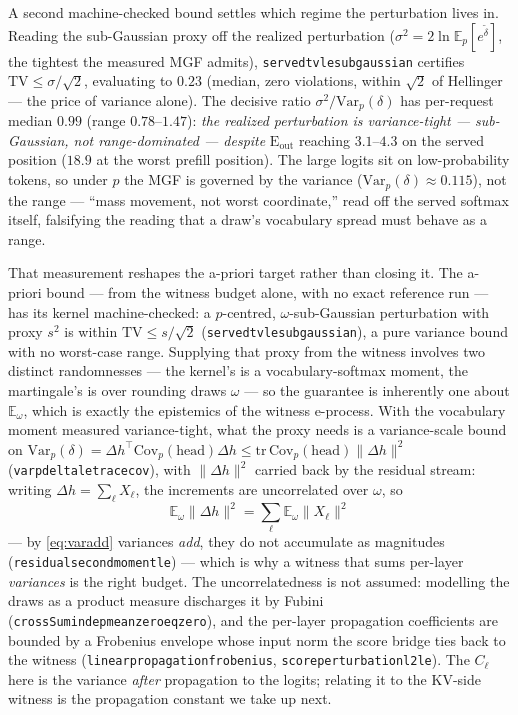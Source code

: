 \documentclass[11pt]{article}
\renewcommand{\_}{\WCorigunderscore\allowbreak}
\begin{document}
A second machine-checked bound settles which regime the perturbation
lives in. Reading the sub-Gaussian proxy off the realized perturbation
($\sigma^2=2\ln\mathbb{E}_p[e^{\tilde\delta}]$, the tightest the
measured MGF admits), \texttt{served\_tv\_le\_subgaussian} certifies
$\mathrm{TV}\le\sigma/\sqrt2$, evaluating to $0.23$ (median, zero
violations, within $\sqrt2$ of Hellinger --- the price of variance
alone). The decisive ratio $\sigma^2/\mathrm{Var}_p(\delta)$ has
per-request median $0.99$ (range $0.78$--$1.47$): \emph{the realized
perturbation is variance-tight --- sub-Gaussian, not range-dominated
--- despite} $\mathrm{E_{out}}$ reaching $3.1$--$4.3$ on the served
position ($18.9$ at the worst prefill position). The large logits sit
on low-probability tokens, so under $p$ the MGF is governed by the
variance ($\mathrm{Var}_p(\delta)\approx0.115$), not the range ---
``mass movement, not worst coordinate,'' read off the served softmax
itself, falsifying the reading that a draw's vocabulary spread must
behave as a range.

That measurement reshapes the a-priori target rather than closing it.
The a-priori bound --- from the witness budget alone, with no exact
reference run --- has its kernel machine-checked: a $p$-centred,
$\omega$-sub-Gaussian perturbation with proxy $s^2$ is within
$\mathrm{TV}\le s/\sqrt2$ (\texttt{served\_tv\_le\_subgaussian}), a pure
variance bound with no worst-case range. Supplying that proxy from the
witness involves two distinct randomnesses --- the kernel's is a
vocabulary-softmax moment, the martingale's is over rounding draws
$\omega$ --- so the guarantee is inherently one about
$\mathbb{E}_\omega$, which is exactly the epistemics of the witness
e-process. With the vocabulary moment measured variance-tight, what the
proxy needs is a variance-scale bound on
$\mathrm{Var}_p(\delta)=\Delta h^\top\mathrm{Cov}_p(\mathrm{head})\Delta h
\le\mathrm{tr}\,\mathrm{Cov}_p(\mathrm{head})\|\Delta h\|^2$
(\texttt{var\_p\_delta\_le\_trace\_cov}), with $\|\Delta h\|^2$ carried
back by the residual stream: writing $\Delta h=\sum_\ell X_\ell$, the
increments are uncorrelated over $\omega$, so
\begin{equation}\label{eq:varadd}
  \mathbb{E}_\omega\|\Delta h\|^2=\sum_\ell\mathbb{E}_\omega\|X_\ell\|^2
\end{equation}
--- by \eqref{eq:varadd} variances \emph{add}, they do not accumulate as
magnitudes (\texttt{residual\_second\_moment\_le}) --- which is why a witness that
sums per-layer \emph{variances} is the right budget. The
uncorrelatedness is not assumed: modelling the draws as a product measure
discharges it by Fubini
(\texttt{crossSum\_indep\_meanzero\_eq\_zero}), and the per-layer
propagation coefficients are bounded by a Frobenius envelope whose input
norm the score bridge ties back to the witness
(\texttt{linear\_propagation\_frobenius},
\texttt{score\_perturbation\_l2\_le}). The $C_\ell$ here is the variance
\emph{after} propagation to the logits; relating it to the KV-side
witness is the propagation constant we take up next.
\end{document}
